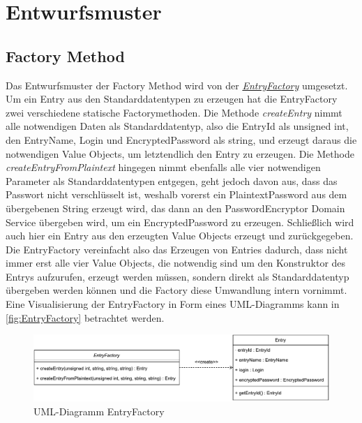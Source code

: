 \chapter{Entwurfsmuster}
\section{Factory Method}
Das Entwurfsmuster der Factory Method wird von der \href{https://github.com/moorts/Morik/blob/main/src/application/EntryFactory.h}{\textit{EntryFactory}} umgesetzt. Um ein Entry aus den Standarddatentypen zu erzeugen hat die EntryFactory zwei verschiedene statische Factorymethoden. Die Methode \textit{createEntry} nimmt alle notwendigen Daten als Standarddatentyp, also die EntryId als unsigned int, den EntryName, Login und EncryptedPassword als string, und erzeugt daraus die notwendigen Value Objects, um letztendlich den Entry zu erzeugen. Die Methode \textit{createEntryFromPlaintext} hingegen nimmt ebenfalls alle vier notwendigen Parameter als Standarddatentypen entgegen, geht jedoch davon aus, dass das Passwort nicht verschlüsselt ist, weshalb vorerst ein PlaintextPassword aus dem übergebenen String erzeugt wird, das dann an den PasswordEncryptor Domain Service übergeben wird, um ein EncryptedPassword zu erzeugen. Schließlich wird auch hier ein Entry aus den erzeugten Value Objects erzeugt und zurückgegeben. Die EntryFactory vereinfacht also das Erzeugen von Entries dadurch, dass nicht immer erst alle vier Value Objects, die notwendig sind um den Konstruktor des Entrys aufzurufen, erzeugt werden müssen, sondern direkt als Standarddatentyp übergeben werden können und die Factory diese Umwandlung intern vornimmt. Eine Visualisierung der EntryFactory in Form eines UML-Diagramms kann in \autoref{fig:EntryFactory} betrachtet werden.\\

\begin{figure}[ht]
	\centering
	\includegraphics[width=1.0\textwidth]{Bilder/EntryFactory.pdf}
	\caption{UML-Diagramm EntryFactory}
	\label{fig:EntryFactory}
\end{figure}

